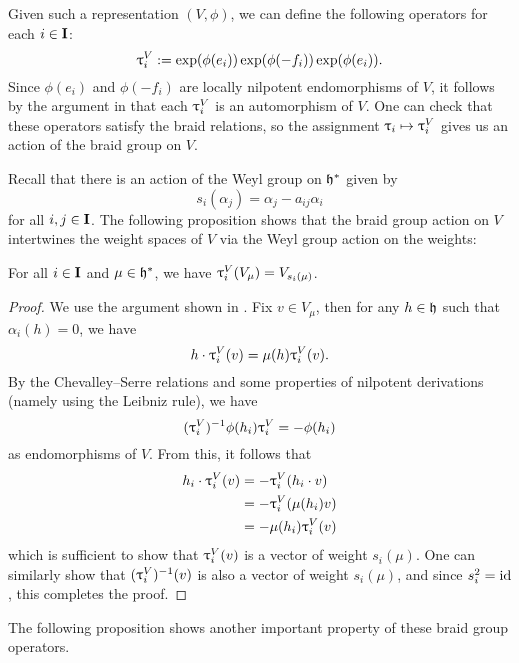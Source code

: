 Given such a representation $(V,\phi)$, we can define the following operators for each $i\in\mathbf{I}$:
\[\uptau_i^V := \exp(\phi(e_i))\exp(\phi(-f_i))\exp(\phi(e_i)).\]
Since $\phi(e_i)$ and $\phi(-f_i)$ are locally nilpotent endomorphisms of $V$, it follows by the argument in \cite[\S21.2]{humphreys_introduction_1972} that each $\uptau_i^V$ is an automorphism of $V$.
One can check that these operators satisfy the braid relations, so the assignment $\uptau_i\mapsto\uptau_i^V$ gives us an action of the braid group on $V$.

Recall that there is an action of the Weyl group on $\mathfrak{h}^*$ given by
\[s_i(\alpha_j) = \alpha_j - a_{ij}\alpha_i\]
for all $i,j\in\mathbf{I}$.
The following proposition shows that the braid group action on $V$ intertwines the weight spaces of $V$ via the Weyl group action on the weights:

\begin{proposition}\label{P:tau-wt-space}
    For all $i\in\mathbf{I}$ and $\mu\in\mathfrak{h}^*$, we have $\uptau_i^V(V_\mu)=V_{s_i(\mu)}$.
\end{proposition}
\begin{proof}
    We use the argument shown in \cite[\S1.3]{kumar_kac-moody_2002}.
    Fix $v\in V_\mu$, then for any $h\in\mathfrak{h}$ such that $\alpha_i(h)=0$, we have
    \[h\cdot \uptau_i^V(v) = \mu(h)\uptau_i^V(v).\]
    By the Chevalley--Serre relations and some properties of nilpotent derivations (namely using the Leibniz rule), we have
    \[(\uptau_i^V)^{-1}\phi(h_i)\uptau_i^V = -\phi(h_i)\]
    as endomorphisms of $V$.
    From this, it follows that
    \begin{align*}
        h_i\cdot\uptau_i^V(v) &= -\uptau_i^V(h_i\cdot v) \\
        &= -\uptau_i^V(\mu(h_i)v) \\
        &= -\mu(h_i)\uptau_i^V(v)
    \end{align*}
    which is sufficient to show that $\uptau_i^V(v)$ is a vector of weight $s_i(\mu)$.
    One can similarly show that $(\uptau_i^V)^{-1}(v)$ is also a vector of weight $s_i(\mu)$, and since $s_i^2={\operatorname{id}}$, this completes the proof.
\end{proof}

The following proposition shows another important property of these braid group operators.

